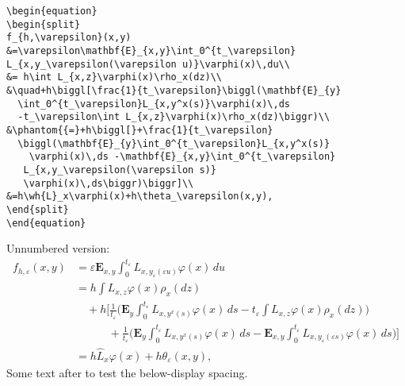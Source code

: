 \documentclass{article}
\theoremstyle{definition}
\theoremstyle{remark}
\newcommand{\wh}{\widehat}
\begin{document}
\begin{verbatim}
\begin{equation}
\begin{split}
f_{h,\varepsilon}(x,y)
&=\varepsilon\mathbf{E}_{x,y}\int_0^{t_\varepsilon}
L_{x,y_\varepsilon(\varepsilon u)}\varphi(x)\,du\\
&= h\int L_{x,z}\varphi(x)\rho_x(dz)\\
&\quad+h\biggl[\frac{1}{t_\varepsilon}\biggl(\mathbf{E}_{y}
  \int_0^{t_\varepsilon}L_{x,y^x(s)}\varphi(x)\,ds
  -t_\varepsilon\int L_{x,z}\varphi(x)\rho_x(dz)\biggr)\\
&\phantom{{=}+h\biggl[}+\frac{1}{t_\varepsilon}
  \biggl(\mathbf{E}_{y}\int_0^{t_\varepsilon}L_{x,y^x(s)}
    \varphi(x)\,ds -\mathbf{E}_{x,y}\int_0^{t_\varepsilon}
   L_{x,y_\varepsilon(\varepsilon s)}
   \varphi(x)\,ds\biggr)\biggr]\\
&=h\wh{L}_x\varphi(x)+h\theta_\varepsilon(x,y),
\end{split}
\end{equation}
\end{verbatim}

\newpage
Unnumbered version:
\begin{equation*}
\begin{split}
f_{h,\varepsilon}(x,y)
&=\varepsilon\mathbf{E}_{x,y}\int_0^{t_\varepsilon}
L_{x,y_\varepsilon(\varepsilon u)}\varphi(x)\,du\\
&= h\int L_{x,z}\varphi(x)\rho_x(dz)\\
&\quad+h\biggl[\frac{1}{t_\varepsilon}\biggl(\mathbf{E}_{y}
  \int_0^{t_\varepsilon}L_{x,y^x(s)}\varphi(x)\,ds
  -t_\varepsilon\int L_{x,z}\varphi(x)\rho_x(dz)\biggr)\\
&\phantom{{=}+h\biggl[}+\frac{1}{t_\varepsilon}
  \biggl(\mathbf{E}_{y}\int_0^{t_\varepsilon}L_{x,y^x(s)}
    \varphi(x)\,ds -\mathbf{E}_{x,y}\int_0^{t_\varepsilon}
   L_{x,y_\varepsilon(\varepsilon s)}
   \varphi(x)\,ds\biggr)\biggr]\\
&=h\wh{L}_x\varphi(x)+h\theta_\varepsilon(x,y),
\end{split}
\end{equation*}
Some text after to test the below-display spacing.
\end{document}
